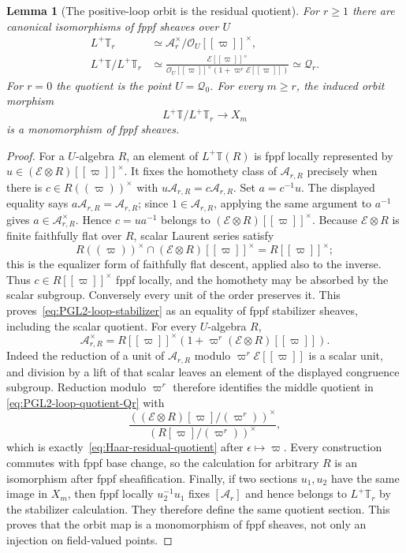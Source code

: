 \documentclass[11pt]{article}
\newtheorem{lemma}[theorem]{Lemma}
\theoremstyle{definition}
\theoremstyle{remark}
\begin{document}
\begin{lemma}[The positive-loop orbit is the residual quotient]
\label{lem:PGL2-loop-orbit-quotient}
For $r\ge1$ there are canonical isomorphisms of fppf sheaves over $U$
\begin{align}
 L^+\mathbb T_r
 &\simeq
 \mathcal A_r^\times/\mathcal O_U[[\varpi]]^\times,
 \label{eq:PGL2-loop-stabilizer}\\
 L^+\mathbb T/L^+\mathbb T_r
 &\simeq
 \frac{\mathcal E[[\varpi]]^\times}
 {\mathcal O_U[[\varpi]]^\times(1+\varpi^r\mathcal E[[\varpi]])}
 \simeq \mathscr Q_r.
 \label{eq:PGL2-loop-quotient-Qr}
\end{align}
For $r=0$ the quotient is the point $U=\mathscr Q_0$.
For every $m\ge r$, the induced orbit morphism
\[
 L^+\mathbb T/L^+\mathbb T_r\longrightarrow X_m
\]
is a monomorphism of fppf sheaves.
\end{lemma}

\begin{proof}
For a $U$-algebra $R$, an element of $L^+\mathbb T(R)$ is fppf locally
represented by $u\in(\mathcal E\otimes R)[[\varpi]]^\times$.  It fixes the
homothety class of $\mathcal A_{r,R}$ precisely when there is
$c\in R((\varpi))^\times$ with
$u\mathcal A_{r,R}=c\mathcal A_{r,R}$.  Set $a=c^{-1}u$.  The displayed equality says
$a\mathcal A_{r,R}=\mathcal A_{r,R}$; since $1\in\mathcal A_{r,R}$, applying
the same argument to $a^{-1}$ gives
$a\in\mathcal A_{r,R}^\times$.  Hence
$c=ua^{-1}$ belongs to
$(\mathcal E\otimes R)[[\varpi]]^\times$.  Because
$\mathcal E\otimes R$ is finite faithfully flat over $R$, scalar Laurent
series satisfy
\[
 R((\varpi))^\times\cap
 (\mathcal E\otimes R)[[\varpi]]^\times
 =R[[\varpi]]^\times;
\]
this is the equalizer form of faithfully flat descent, applied also to the
inverse.  Thus $c\in R[[\varpi]]^\times$ fppf locally, and the homothety may
be absorbed by the scalar subgroup.  Conversely every unit of the order
preserves it.  This proves~\eqref{eq:PGL2-loop-stabilizer} as an equality of
fppf stabilizer sheaves, including the scalar quotient.
For every $U$-algebra $R$,
\[
 \mathcal A_{r,R}^\times
 =R[[\varpi]]^\times
  (1+\varpi^r(\mathcal E\otimes R)[[\varpi]]).
\]
Indeed the reduction of a unit of $\mathcal A_{r,R}$ modulo
$\varpi^r\mathcal E[[\varpi]]$ is a scalar unit, and division by a lift of
that scalar leaves an element of the displayed congruence subgroup.
Reduction modulo $\varpi^r$ therefore identifies the middle quotient in
\eqref{eq:PGL2-loop-quotient-Qr} with
\[
 \frac{((\mathcal E\otimes R)[\varpi]/(\varpi^r))^\times}
      {(R[\varpi]/(\varpi^r))^\times},
\]
which is exactly~\eqref{eq:Haar-residual-quotient} after
$\epsilon\mapsto\varpi$.  Every construction commutes with fppf base change,
so the calculation for arbitrary $R$ is an isomorphism after fppf
sheafification.  Finally, if two sections $u_1,u_2$ have the same image in
$X_m$, then fppf locally
$u_2^{-1}u_1$ fixes $[\mathcal A_r]$ and hence belongs to
$L^+\mathbb T_r$ by the stabilizer calculation.  They therefore define the
same quotient section.  This proves that the orbit map is a monomorphism of
fppf sheaves, not only an injection on field-valued points.
\end{proof}
\end{document}
